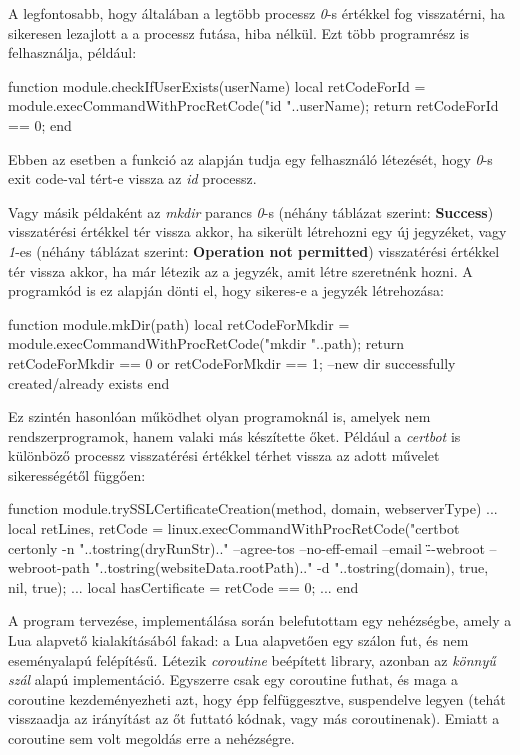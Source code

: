 A legfontosabb, hogy általában a legtöbb processz \textit{0}-s értékkel fog visszatérni, ha sikeresen lezajlott a a processz futása, hiba nélkül. Ezt több programrész is felhasználja, például:

\begin{lua}
function module.checkIfUserExists(userName)
    local retCodeForId = module.execCommandWithProcRetCode("id "..userName);
    return retCodeForId == 0;
end
\end{lua}

Ebben az esetben a \texttt{} funkció az alapján tudja egy felhasználó létezését, hogy \textit{0}-s exit code-val tért-e vissza az \textit{id} processz.

Vagy másik példaként az \textit{mkdir} parancs \textit{0}-s (néhány táblázat szerint: \textbf{Success}) visszatérési értékkel tér vissza akkor, ha sikerült létrehozni egy új jegyzéket, vagy \textit{1}-es (néhány táblázat szerint: \textbf{Operation not permitted}) visszatérési értékkel tér vissza akkor, ha már létezik az a jegyzék, amit létre szeretnénk hozni. A programkód is ez alapján dönti el, hogy sikeres-e a jegyzék létrehozása:
\begin{lua}
function module.mkDir(path)
    local retCodeForMkdir = module.execCommandWithProcRetCode("mkdir "..path);
    return retCodeForMkdir == 0 or retCodeForMkdir == 1; --new dir successfully created/already exists
end
\end{lua}

Ez szintén hasonlóan működhet olyan programoknál is, amelyek nem rendszerprogramok, hanem valaki más készítette őket. Például a \textit{certbot} is különböző processz visszatérési értékkel térhet vissza az adott művelet sikerességétől függően:
\begin{lua}
function module.trySSLCertificateCreation(method, domain, webserverType)
    ...
    local retLines, retCode = linux.execCommandWithProcRetCode("certbot certonly -n "..tostring(dryRunStr).." --agree-tos --no-eff-email --email \"\" --webroot --webroot-path "..tostring(websiteData.rootPath).." -d "..tostring(domain), true, nil, true);
    ...
    local hasCertificate = retCode == 0;
    ...
end
\end{lua}

\pagebreak
{}

A program tervezése, implementálása során belefutottam egy nehézségbe, amely a Lua alapvető kialakításából fakad: a Lua alapvetően egy szálon fut, és nem eseményalapú felépítésű. Létezik \textit{coroutine} beépített library, azonban az \textit{könnyű szál} alapú implementáció. Egyszerre csak egy coroutine futhat, és maga a coroutine kezdeményezheti azt, hogy épp felfüggesztve, suspendelve legyen (tehát visszaadja az irányítást az őt futtató kódnak, vagy más coroutinenak). Emiatt a coroutine sem volt megoldás erre a nehézségre.

